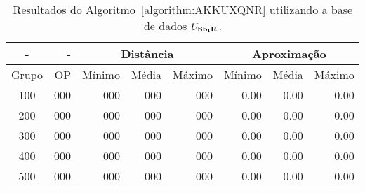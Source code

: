 \begin{table}[!htb]\label{table:PSYFOCXO}
  \caption{Resultados do Algoritmo~\ref{algorithm:AKKUXQNR} utilizando a base de dados $U_{\textbf{Sb\textsubscript{I}R}}{}$.}
  \centering
  \begin{tabular}{|c|r|r|r|r|r|r|r|}
    \hline
      -      &  -   & \multicolumn{3}{c|}{Distância}             & \multicolumn{3}{c|}{Aproximação}           \\ \hline
    Grupo    & OP   & Mínimo       & Média        & Máximo       & Mínimo       & Média        & Máximo       \\ \hline  
    100      & 000  & 000          & 000          & 000          & 0.00         & 0.00         & 0.00         \\ \hline
    200      & 000  & 000          & 000          & 000          & 0.00         & 0.00         & 0.00         \\ \hline
    300      & 000  & 000          & 000          & 000          & 0.00         & 0.00         & 0.00         \\ \hline
    400      & 000  & 000          & 000          & 000          & 0.00         & 0.00         & 0.00         \\ \hline
    500      & 000  & 000          & 000          & 000          & 0.00         & 0.00         & 0.00         \\ \hline    
  \end{tabular}
\end{table}